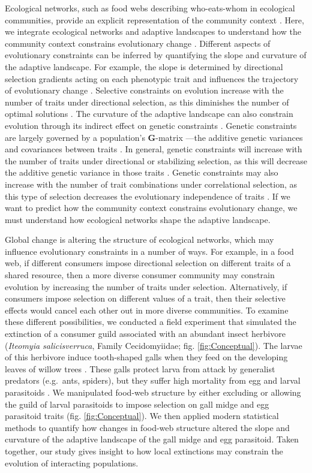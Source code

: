 \documentclass[11pt,]{article}
\begin{document}
Ecological networks, such as food webs describing who-eats-whom in
ecological communities, provide an explicit representation of the
community context \citep{Bascompte2014, McCann2012}. Here, we integrate
ecological networks and adaptive landscapes to understand how the
community context constrains evolutionary change \citep{Arnold1992}.
Different aspects of evolutionary constraints can be inferred by
quantifying the slope and curvature of the adaptive landscape. For
example, the slope is determined by directional selection gradients
acting on each phenotypic trait and influences the trajectory of
evolutionary change \citep{Lande1979, Arnold1992}. Selective constraints
on evolution increase with the number of traits under directional
selection, as this diminishes the number of optimal solutions
\citep{Arnold2003}. The curvature of the adaptive landscape can also
constrain evolution through its indirect effect on genetic constraints
\citep{Arnold1992, Hansen2008}. Genetic constraints are largely governed
by a population's \textbf{G}-matrix ---the additive genetic variances
and covariances between traits \citep{Hansen2008}. In general, genetic
constraints will increase with the number of traits under directional or
stabilizing selection, as this will decrease the additive genetic
variance in those traits \citep{Hansen2008}. Genetic constraints may
also increase with the number of trait combinations under correlational
selection, as this type of selection decreases the evolutionary
independence of traits \citep{Hansen2008}. If we want to predict how the
community context constrains evolutionary change, we must understand how
ecological networks shape the adaptive landscape.

Global change is altering the structure of ecological networks, which
may influence evolutionary constraints in a number of ways. For example,
in a food web, if different consumers impose directional selection on
different traits of a shared resource, then a more diverse consumer
community may constrain evolution by increasing the number of traits
under selection. Alternatively, if consumers impose selection on
different values of a trait, then their selective effects would cancel
each other out in more diverse communities. To examine these different
possibilities, we conducted a field experiment that simulated the
extinction of a consumer guild associated with an abundant insect
herbivore (\emph{Iteomyia salicisverruca}, Family Cecidomyiidae; fig.
\ref{fig:Conceptual}). The larvae of this herbivore induce tooth-shaped
galls when they feed on the developing leaves of willow trees
\citep[\emph{Salix} sp.,][]{Russo2006}. These galls protect larva from
attack by generalist predators (e.g.~ants, spiders), but they suffer
high mortality from egg and larval parasitoids \citep{Barbour2016}. We
manipulated food-web structure by either excluding or allowing the guild
of larval parasitoids to impose selection on gall midge and egg
parasitoid traits (fig. \ref{fig:Conceptual}). We then applied modern
statistical methods to quantify how changes in food-web structure
altered the slope and curvature of the adaptive landscape of the gall
midge and egg parasitoid. Taken together, our study gives insight to how
local extinctions may constrain the evolution of interacting
populations.
\end{document}
